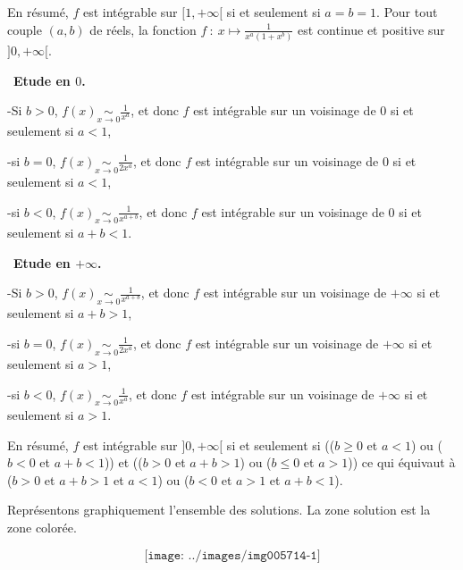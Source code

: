 {{En résumé, $f$ est intégrable sur $[1,+\infty[$ si et seulement si $a = b = 1$.
Pour tout couple $(a,b)$ de réels, la fonction $f~:~ x\mapsto\frac{1}{x^a(1+x^b)}$ est continue et positive sur $]0,+\infty[$.

\textbullet~\textbf{Etude en $0$.} 

-Si $b>0$, $f(x)\underset{x\rightarrow0}{\sim}\frac{1}{x^a}$, et donc $f$ est intégrable sur un voisinage de $0$ si et seulement si $a<1$,

-si $b=0$, $f(x)\underset{x\rightarrow0}{\sim}\frac{1}{2x^a}$, et donc $f$ est intégrable sur un voisinage de $0$ si et seulement si $a<1$,

-si $b<0$, $f(x)\underset{x\rightarrow0}{\sim}\frac{1}{x^{a+b}}$, et donc $f$ est intégrable sur un voisinage de $0$ si et seulement si $a+b<1$.

\textbullet~\textbf{Etude en $+\infty$.} 

-Si $b>0$, $f(x)\underset{x\rightarrow0}{\sim}\frac{1}{x^{a+b}}$, et donc $f$ est intégrable sur un voisinage de $+\infty$ si et seulement si $a+b>1$,

-si $b=0$, $f(x)\underset{x\rightarrow0}{\sim}\frac{1}{2x^a}$, et donc $f$ est intégrable sur un voisinage de $+\infty$ si et seulement si $a>1$,

-si $b<0$, $f(x)\underset{x\rightarrow0}{\sim}\frac{1}{x^{a}}$, et donc $f$ est intégrable sur un voisinage de $+\infty$ si et seulement si $a>1$.

En résumé, $f$ est intégrable sur $]0,+\infty[$ si et seulement si (($b\geqslant0$ et $a<1$) ou ($b<0$ et $a+b<1$)) et (($b>0$ et $a+b>1$) ou ($b\leqslant0$ et $a>1$)) ce qui équivaut à ($b>0$ et $a+b>1$ et $a<1$) ou ($b<0$ et $a>1$ et $a+b<1$).

Représentons graphiquement l'ensemble des solutions. La zone solution est la zone colorée.

$$\texttt{[image: ../images/img005714-1]}$$
}
}
